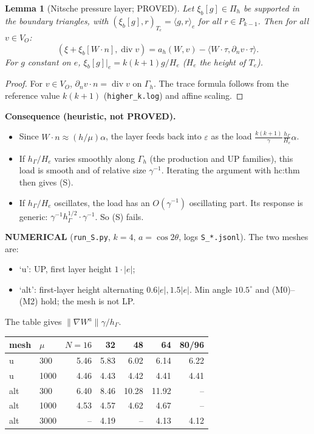 \documentclass[11pt]{article}
\newtheorem{lemma}[theorem]{Lemma}
\theoremstyle{remark}
\newcommand{\hG}{h_\Gamma}
\newcommand{\Gh}{\Gamma_h}
\newcommand{\ip}[2]{\langle #1,#2\rangle}
\begin{document}
\begin{lemma}[Nitsche pressure layer; PROVED]\label{lem:layer}
Let $\xi_b[g]\in\Pi_h$ be supported in the boundary triangles, with $(\xi_b[g],r)_{T_e}=\ip gr_e$ for all $r\in P_{k-1}$. Then for all $v\in V_O$:
\[
(\xi+\xi_b[W\cdot n],\operatorname{div}v)=a_h(W,v)-\ip{W\cdot\tau}{\partial_nv\cdot\tau} .
\]
For $g$ constant on $e$, $\xi_b[g]|_e=k(k+1)g/H_e$ ($H_e$ the height of $T_e$).
\end{lemma}
\begin{proof}
For $v\in V_O$, $\partial_nv\cdot n=\operatorname{div}v$ on $\Gh$. The trace formula follows from the reference value $k(k+1)$
(\texttt{higher\_k.log}) and affine scaling.
\end{proof}

\noindent\textbf{Consequence (heuristic, not PROVED).}
\begin{itemize}
\item Since $W\cdot n\approx(h/\mu)\alpha$, the layer feeds back into $\varepsilon$ as the load $\frac{k(k+1)}\gamma\frac{\hG}{H_e}\alpha$.
\item If $\hG/H_e$ varies smoothly along $\Gh$ (the production and \textsf{UP} families), this load is smooth and of relative size $\gamma^{-1}$. Iterating the
 argument with hc:thm then gives (S).
\item If $\hG/H_e$ oscillates, the load has an $O(\gamma^{-1})$ oscillating part. Its response is generic: $\gamma^{-1}\hG^{1/2}\cdot\gamma^{-1}$. So (S) fails.
\end{itemize}

\noindent\textbf{NUMERICAL} (\texttt{run\_S.py}, $k=4$, $a=\cos2\theta$, logs \texttt{S\_*.jsonl}). The two meshes are:
\begin{itemize}
\item `u': \textsf{UP}, first layer height $1\cdot|e|$;
\item `alt': first-layer height alternating $0.6|e|,1.5|e|$. Min angle $10.5^\circ$ and (M0)--(M2) hold; the mesh is not LP.
\end{itemize}
The table gives $\|\nabla W^a\|\gamma/\hG$.

\smallskip
\begin{tabular}{llrrrrr}\toprule
mesh & $\mu$ & $N=16$ & 32 & 48 & 64 & 80/96\\\midrule
u & 300 & 5.46 & 5.83 & 6.02 & 6.14 & 6.22\\
u & 1000 & 4.46 & 4.43 & 4.42 & 4.41 & 4.41\\
alt & 300 & 6.40 & 8.46 & 10.28 & 11.92 & --\\
alt & 1000 & 4.53 & 4.57 & 4.62 & 4.67 & --\\
alt & 3000 & -- & 4.19 & -- & 4.13 & 4.12\\\bottomrule
\end{tabular}
\smallskip
\end{document}

